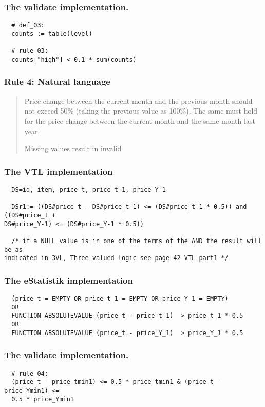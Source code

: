 \subsubsection*{The validate implementation.}
\begin{verbatim}
  # def_03:
  counts := table(level)

  # rule_03:
  counts["high"] < 0.1 * sum(counts)
\end{verbatim}


\newpage

\subsubsection*{  Rule 4: Natural language}
\begin{quote}


Price change between the current month and the previous month should not exceed 50\% (taking the previous value as 100\%). The same must hold for the price change between the current month and the same month last year.

Missing values result in invalid



\end{quote}
\subsubsection*{The VTL implementation}
\begin{verbatim}
  DS=id, item, price_t, price_t-1, price_Y-1

  DSr1:= ((DS#price_t - DS#price_t-1) <= (DS#price_t-1 * 0.5)) and ((DS#price_t +
DS#price_Y-1) <= (DS#price_Y-1 * 0.5))

  /* if a NULL value is in one of the terms of the AND the result will be as
indicated in 3VL, Three-valued logic see page 42 VTL-part1 */
\end{verbatim}
\subsubsection*{The eStatistik implementation}
\begin{verbatim}
  (price_t = EMPTY OR price_t_1 = EMPTY OR price_Y_1 = EMPTY)
  OR
  FUNCTION ABSOLUTEVALUE (price_t - price_t_1)  > price_t_1 * 0.5
  OR
  FUNCTION ABSOLUTEVALUE (price_t - price_Y_1)  > price_Y_1 * 0.5\end{verbatim}
\subsubsection*{The validate implementation.}
\begin{verbatim}
  # rule_04:
  (price_t - price_tmin1) <= 0.5 * price_tmin1 & (price_t - price_Ymin1) <=
  0.5 * price_Ymin1
\end{verbatim}


